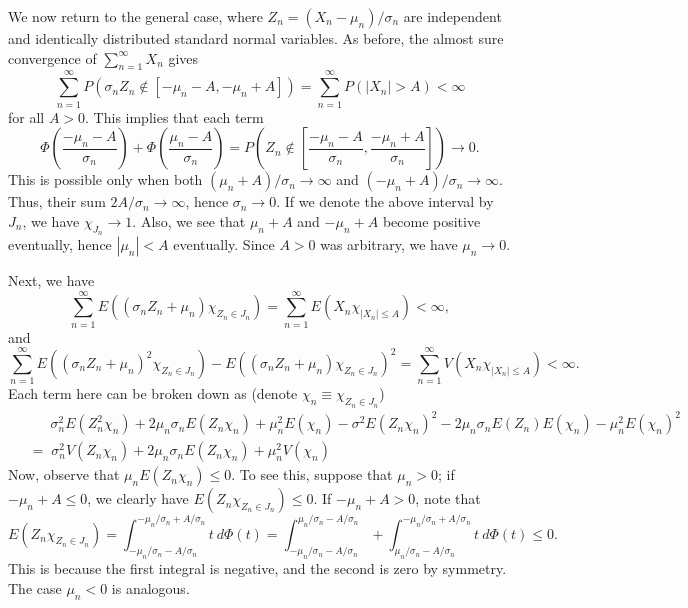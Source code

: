 \documentclass[10pt]{article}
\begin{document}
    We now return to the general case, where $Z_n = (X_n - \mu_n) / \sigma_n$ are
    independent and identically distributed standard normal variables. As before, the
    almost sure convergence of $\sum_{n = 1}^\infty X_n$ gives \[
        \sum_{n = 1}^\infty P(\sigma_nZ_n \notin [-\mu_n - A, -\mu_n + A]) =
        \sum_{n = 1}^\infty P(|X_n| > A) < \infty
    \] for all $A > 0$. This implies that each term \[
        \Phi\left(\frac{-\mu_n - A}{\sigma_n}\right) + \Phi\left(\frac{\mu_n -
        A}{\sigma_n}\right)
        = P\left(Z_n \notin \left[\frac{-\mu_n - A}{\sigma_n}, \frac{-\mu_n +
        A}{\sigma_n}\right]\right) \to 0.
    \] This is possible only when both $(\mu_n + A)/\sigma_n \to \infty$ and $(-\mu_n
    + A)/\sigma_n \to \infty$. Thus, their sum $2A/\sigma_n \to \infty$, hence
    $\sigma_n \to 0$. If we denote the above interval by $J_n$, we have $\chi_{J_n}
    \to 1$. Also, we see that $\mu_n + A$ and $-\mu_n + A$ become positive
    eventually, hence $|\mu_n| < A$ eventually. Since $A > 0$ was arbitrary, we have
    $\mu_n \to 0$.


    Next, we have \[
        \sum_{n = 1}^\infty E((\sigma_nZ_n + \mu_n)\chi_{Z_n \in J_n}) =
        \sum_{n = 1}^\infty E(X_n\chi_{|X_n| \leq A}) < \infty,
    \] and \[
        \sum_{n = 1}^\infty E((\sigma_nZ_n + \mu_n)^2\chi_{Z_n \in J_n}) -
        E((\sigma_nZ_n + \mu_n)\chi_{Z_n \in J_n})^2 =
        \sum_{n = 1}^\infty V(X_n\chi_{|X_n| \leq A}) < \infty.
    \] Each term here can be broken down as (denote $\chi_n \equiv \chi_{Z_n \in
    J_n}$)\begin{align*}
        &\quad\;\;\sigma_n^2E(Z_n^2\chi_n) + 2\mu_n\sigma_nE(Z_n\chi_n) + \mu_n^2E(\chi_n) -
        \sigma^2E(Z_n\chi_n)^2 - 2\mu_n\sigma_nE(Z_n)E(\chi_n) -
        \mu_n^2E(\chi_n)^2 \\
        \;&=\; \sigma_n^2 V(Z_n\chi_n) + 2\mu_n\sigma_n E(Z_n\chi_n) +
        \mu_n^2 V(\chi_n)
    \end{align*}
    Now, observe that $\mu_n E(Z_n\chi_n) \leq 0$. To see this, suppose that $\mu_n >
    0$; if $-\mu_n + A \leq 0$, we clearly have $E(Z_n\chi_{Z_n \in J_n}) \leq 0$. If
    $-\mu_n + A > 0$, note that \[
        E(Z_n\chi_{Z_n \in J_n}) = \int_{-\mu_n/\sigma_n -
        A/\sigma_n}^{-\mu_n/\sigma_n + A/\sigma_n} t \:d\Phi(t) =
        \int_{-\mu_n/\sigma_n -
        A/\sigma_n}^{\mu_n/\sigma_n - A/\sigma_n} + \int_{\mu_n/\sigma_n -
        A/\sigma_n}^{-\mu_n/\sigma_n + A/\sigma_n} t \:d\Phi(t) \leq 0.
    \] This is because the first integral is negative, and the second is zero by
    symmetry. The case $\mu_n < 0$ is analogous.
\end{document}
